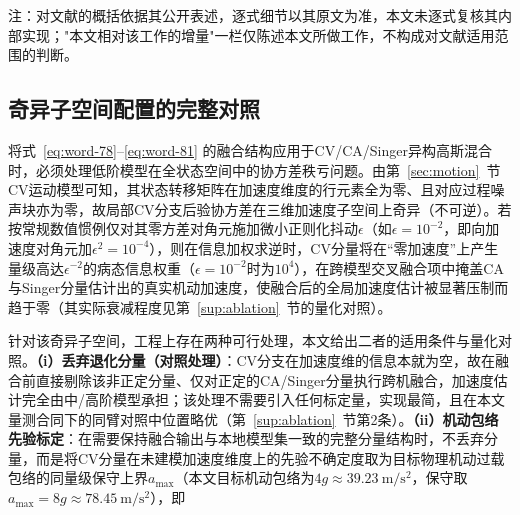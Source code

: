 \documentclass[UTF8,a4paper,zihao=-4]{ctexart}
\begin{document}
\begin{table}[htbp]
\centering
\caption{模式条件融合与直接近邻的公式级比较}\label{tab:fusion-compare}
\par\vspace{2pt}\footnotesize 注：对文献的概括依据其公开表述，逐式细节以其原文为准，本文未逐式复核其内部实现；"本文相对该工作的增量"一栏仅陈述本文所做工作，不构成对文献适用范围的判断。
\end{table}



\subsection{奇异子空间配置的完整对照}\label{sup:cv}
将式~\eqref{eq:word-78}--\eqref{eq:word-81} 的融合结构应用于CV/CA/Singer异构高斯混合时，必须处理低阶模型在全状态空间中的协方差秩亏问题。由第~\ref{sec:motion}~节CV运动模型可知，其状态转移矩阵在加速度维度的行元素全为零、且对应过程噪声块亦为零，故局部CV分支后验协方差在三维加速度子空间上奇异（不可逆）。若按常规数值惯例仅对其零方差对角元施加微小正则化抖动\(\epsilon\)（如\(\epsilon=10^{-2}\)，即向加速度对角元加\(\epsilon^{2}=10^{-4}\)），则在信息加权求逆时，CV分量将在“零加速度”上产生量级高达\(\epsilon^{-2}\)的病态信息权重（\(\epsilon=10^{-2}\)时为\(10^{4}\)），在跨模型交叉融合项中掩盖CA与Singer分量估计出的真实机动加速度，使融合后的全局加速度估计被显著压制而趋于零（其实际衰减程度见第~\ref{sup:ablation}~节的量化对照）。

针对该奇异子空间，工程上存在两种可行处理，本文给出二者的适用条件与量化对照。\textbf{（i）丢弃退化分量（对照处理）}：CV分支在加速度维的信息本就为空，故在融合前直接剔除该非正定分量、仅对正定的CA/Singer分量执行跨机融合，加速度估计完全由中/高阶模型承担；该处理不需要引入任何标定量，实现最简，且在本文量测合同下的同臂对照中位置略优（第~\ref{sup:ablation}~节第2条）。\textbf{（ii）机动包络先验标定}：在需要保持融合输出与本地模型集一致的完整分量结构时，不丢弃分量，而是将CV分量在未建模加速度维度上的先验不确定度取为目标物理机动过载包络的同量级保守上界\(a_{\max}\)（本文目标机动包络为\(4g\approx39.23\ \mathrm{m/s^2}\)，保守取\(a_{\max}=8g\approx78.45\ \mathrm{m/s^2}\)），即
\end{document}
